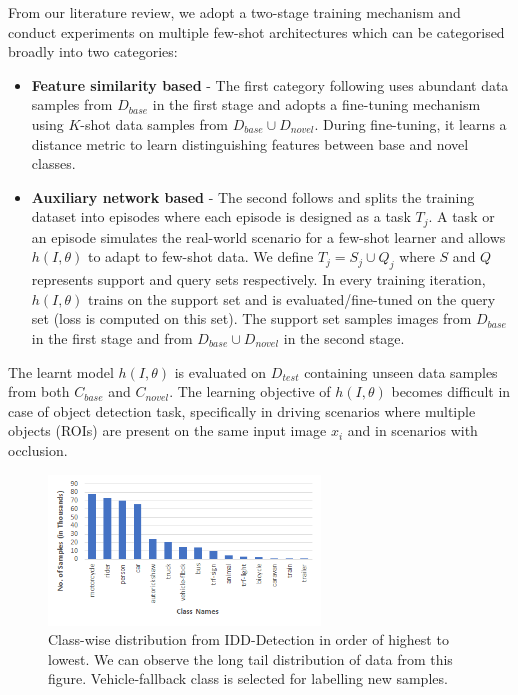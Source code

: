 \documentclass[letterpaper]{article} %
\begin{document}
From our literature review, we adopt a two-stage training mechanism and conduct experiments on multiple few-shot architectures which can be categorised broadly into two categories: 
\begin{itemize}
      \item \textbf{Feature similarity based} - The first category following \cite{fsdet} uses abundant data samples from $D_{base}$ in the first stage and adopts a fine-tuning mechanism using $K$-shot data samples from $D_{base} \cup D_{novel}$. During fine-tuning, it learns a distance metric to learn distinguishing features between base and novel classes.
      \item \textbf{Auxiliary network based} - The second follows \cite{reweight,addfeat,metarcnn} and splits the training dataset into episodes where each episode is designed as a task $T_{j}$. A task or an episode simulates the real-world scenario for a few-shot learner and allows $h(I,\theta)$ to adapt to few-shot data. We define $T_{j} = S_{j} \cup Q_{j}$ where $S$ and $Q$ represents support and query sets respectively. In every training iteration, $h(I,\theta)$ trains on the support set and is evaluated/fine-tuned on the query set (loss is computed on this set). The support set samples images from $D_{base}$ in the first stage and from $D_{base} \cup D_{novel}$ in the second stage.
\end{itemize}

The learnt model $h(I,\theta)$ is evaluated on $D_{test}$ containing unseen data samples from both $C_{base}$ and $C_{novel}$. The learning objective of $h(I,\theta)$ becomes difficult in case of object detection task, specifically in driving scenarios where multiple objects (ROIs) are present on the same input image $x_{i}$ and in scenarios with occlusion. 

\begin{figure}[t]
\centering  
\includegraphics[width=0.9\columnwidth,height=4cm]{idd_distribution}
\caption{Class-wise distribution from IDD-Detection in order of highest to lowest. We can observe the long tail distribution of data from this figure. Vehicle-fallback class is selected for labelling new samples.}
\label{fig_dist}
\end{figure}
\end{document}
